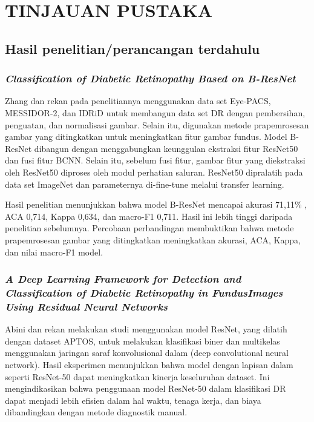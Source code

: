 \chapter{TINJAUAN PUSTAKA}

\section{Hasil penelitian/perancangan terdahulu}
\subsection{\emph{Classification of Diabetic Retinopathy Based on B-ResNet}}
Zhang dan rekan \parencite{zhang2022residual} pada penelitiannya menggunakan data set Eye-PACS, MESSIDOR-2, dan IDRiD untuk membangun data set DR dengan pembersihan, penguatan, dan normalisasi gambar. Selain itu, digunakan metode prapemrosesan gambar yang ditingkatkan untuk meningkatkan fitur gambar fundus. Model B-ResNet dibangun dengan menggabungkan keunggulan ekstraksi fitur ResNet50 dan fusi fitur BCNN. Selain itu, sebelum fusi fitur, gambar fitur yang diekstraksi oleh ResNet50 diproses oleh modul perhatian saluran. ResNet50 dipralatih pada data set ImageNet dan parameternya di-fine-tune melalui transfer learning.

Hasil penelitian menunjukkan bahwa model B-ResNet mencapai akurasi 71,11\% , ACA 0,714, Kappa 0,634, dan macro-F1 0,711. Hasil ini lebih tinggi daripada penelitian sebelumnya. Percobaan perbandingan membuktikan bahwa metode prapemrosesan gambar yang ditingkatkan meningkatkan akurasi, ACA, Kappa, dan nilai macro-F1 model.

\subsection{\emph{A Deep Learning Framework for Detection and Classification of Diabetic Retinopathy in FundusImages Using Residual Neural Networks}}

Abini dan rekan \parencite{10335079} melakukan studi menggunakan model ResNet, yang dilatih dengan dataset APTOS, untuk melakukan klasifikasi biner dan multikelas menggunakan jaringan saraf konvolusional dalam (deep convolutional neural network). Hasil eksperimen menunjukkan bahwa model dengan lapisan dalam seperti ResNet-50 dapat meningkatkan kinerja keseluruhan dataset. Ini mengindikasikan bahwa penggunaan model ResNet-50 dalam klasifikasi DR dapat menjadi lebih efisien dalam hal waktu, tenaga kerja, dan biaya dibandingkan dengan metode diagnostik manual.

